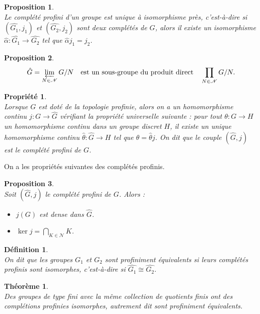 \documentclass[a4paper, 14pt]{report}
\newtheorem{definition}{Définition}[section]
\newtheorem{proposition}{Proposition}[section]
\newtheorem{propriety}{Propriété}[section]
\newtheorem{theorem}{Théorème}[section]
\begin{document}
\begin{onehalfspace}
{\begin{proposition} \cite{herfort2012profinite}\\
Le complété profini d’un groupe est unique à isomorphisme près, c’est-à-dire si $(\widehat{G_1}, j_1)$ et $(\widehat{G_2}, j_2)$ sont deux complétés de $G$, alors il existe un isomorphisme $\widehat{\alpha} : \widehat{G_1} \to \widehat{G_2}$ tel que $\widehat{\alpha} j_1 = j_2$.
\end{proposition}

\begin{proposition} \cite{herfort2012profinite}\\
	\[
	\hat{G} = \varprojlim_{N \in \mathscr{N}} G/N \quad \text{est un sous-groupe du produit direct} \quad \prod_{N \in \mathscr{N}} G/N.
	\]
\end{proposition}


\begin{propriety}  \cite{herfort2012profinite}\\
Lorsque $G$ est doté de la topologie profinie, alors on a un homomorphisme continu $j : G \to \widehat{G}$ vérifiant la propriété universelle suivante : pour tout $\theta : G \to H$ un homomorphisme continu dans un groupe discret $H$, il existe un unique homomorphisme continu $\widehat{\theta} : \widehat{G} \to H$ tel que $\theta = \widehat{\theta} j$. On dit que le couple $(\widehat{G}, j)$ est le complété profini de $G$.
\end{propriety}
On a les propriétés suivantes des complétés profinis.

\begin{proposition} \cite{ribes-zalesskii}\\
Soit $(\widehat{G}, j)$ le complété profini de $G$. Alors :
	\begin{itemize}
		\item[(a)] $j(G)$ est dense dans $\widehat{G}$.
		\item[(b)] $\ker j = \bigcap_{K \in \mathcal{N}} K$.
	\end{itemize}	
\end{proposition}


\begin{definition} \cite{ribes-zalesskii}\\
On dit que les groupes $G_1$ et $G_2$ sont \textit{profiniment équivalents} si leurs complétés profinis sont isomorphes, c'est-à-dire si $\widehat{G_1} \cong \widehat{G_2}$.
\end{definition}

\begin{theorem} \cite{herfort2012profinite}\\
Des groupes de type fini avec la même collection de quotients finis ont des complétions profinies isomorphes, autrement dit sont profiniment équivalents.
\end{theorem}

}
\end{onehalfspace}
\end{document}
